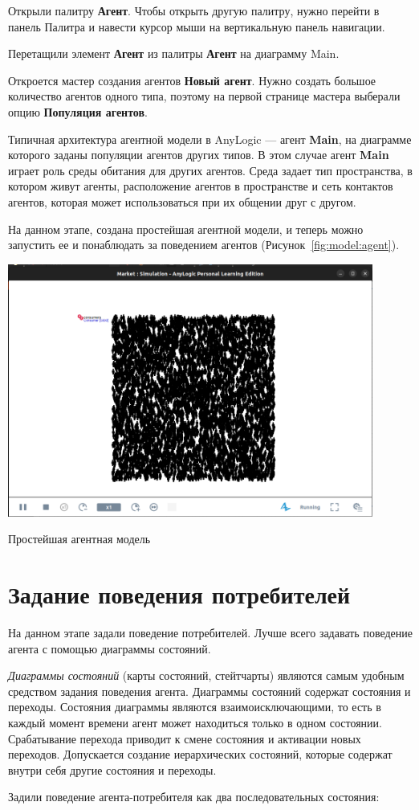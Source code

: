 Открыли палитру \textbf{Агент}. Чтобы открыть другую палитру,
нужно перейти в панель Палитра и навести курсор мыши на вертикальную
панель навигации.\par
Перетащили элемент \textbf{Агент} из палитры \textbf{Агент}
на диаграмму Main.\par
Откроется мастер создания агентов \textbf{Новый агент}. Нужно создать
большое количество агентов одного типа, поэтому на первой странице
мастера выберали опцию \textbf{Популяция агентов}.\par

Типичная архитектура агентной модели в AnyLogic --- агент \textbf{Main},
на диаграмме которого заданы популяции агентов других типов.
В этом случае агент \textbf{Main} играет роль среды обитания
для других агентов. Среда задает тип пространства,
в котором живут агенты, расположение агентов в пространстве и сеть контактов
агентов, которая может использоваться при их общении друг с другом.\par

На данном этапе, создана простейшая агентной модели, и теперь можно
запустить ее и понаблюдать за поведением агентов
(Рисунок~\ref{fig:model:agent}).

\begin{image}
	\includegraphics[width=0.9\textwidth]{Screenshot from 2023-03-27 20-00-54.png}
	\caption{Простейшая агентная модель}
	\label{fig:model:agent}
\end{image}

\section{Задание поведения потребителей}
На данном этапе задали поведение потребителей. Лучше всего задавать
поведение агента с помощью диаграммы состояний.\par
\textit{Диаграммы состояний} (карты состояний, стейтчарты) являются самым
удобным средством задания поведения агента. Диаграммы состояний
содержат состояния и переходы. Состояния диаграммы являются
взаимоисключающими, то есть в каждый момент времени агент может
находиться только в одном состоянии. Срабатывание перехода
приводит к смене состояния и активации новых переходов. Допускается
создание иерархических состояний, которые содержат внутри себя
другие состояния и переходы.\par
Задили поведение агента-потребителя как два последовательных
состояния:

